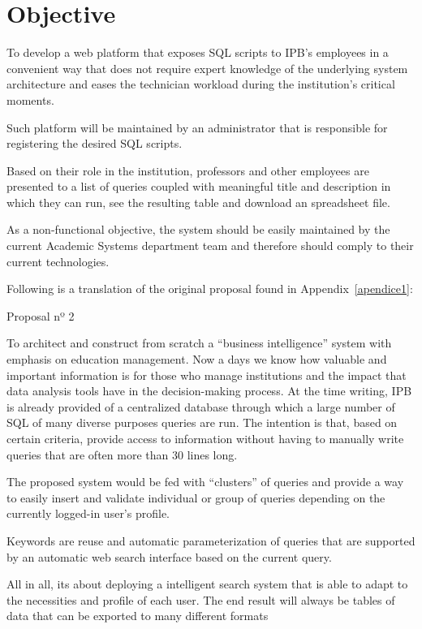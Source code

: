 \chapter{Objective}\label{objective}

To develop a web platform that exposes \gls{SQL} scripts to \gls{IPB}'s employees in a convenient way that does not require expert knowledge of the underlying system architecture and eases the technician workload during the institution's critical moments.

Such platform will be maintained by an administrator that is responsible for registering the desired \gls{SQL} scripts.

Based on their role in the institution, professors and other employees are presented to a list of queries coupled with meaningful title and description in which they can run, see the resulting table and download an spreadsheet file.

As a non-functional objective, the system should be easily maintained by the current Academic Systems department team and therefore should comply to their current technologies.

Following is a translation of the original proposal found in Appendix~\ref{apendice1}:
\begin{displayquote}
  Proposal nº 2

  To architect and construct from scratch a ``business intelligence'' system with emphasis on education management.
  Now a days we know how valuable and important information is for those who manage institutions and the impact that data analysis tools have in the decision-making process.
  At the time writing, \gls{IPB} is already provided of a centralized database through which a large number of \gls{SQL} of many diverse purposes queries are run.
  The intention is that, based on certain criteria, provide access to information without having to manually write queries that are often more than 30 lines long.

  The proposed system would be fed with ``clusters'' of queries and provide a way to easily insert and validate individual or group of queries depending on the currently logged-in user's profile.

  Keywords are reuse and automatic parameterization of queries that are supported by an automatic web search interface based on the current query.

  All in all, its about deploying a intelligent search system that is able to adapt to the necessities and profile of each user. The end result will always be tables of data that can be exported to many different formats
\end{displayquote}
